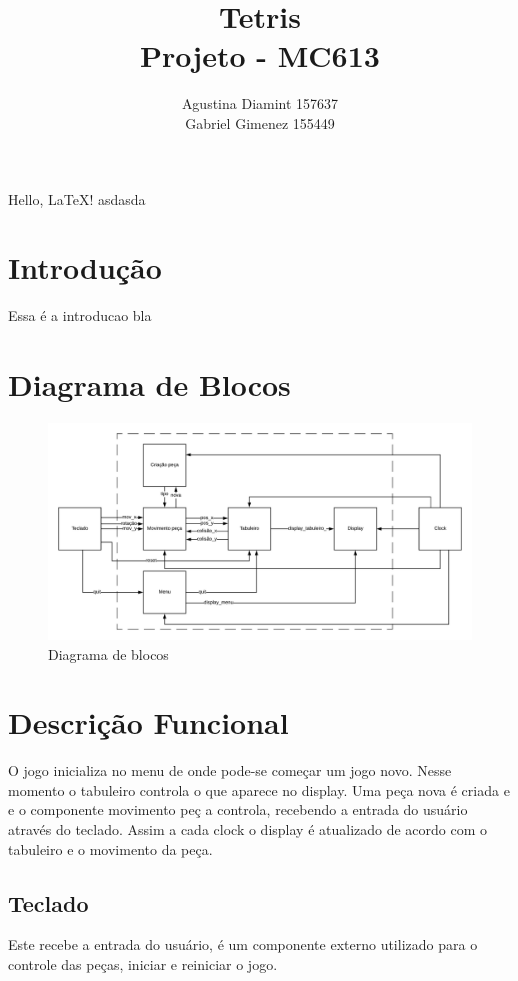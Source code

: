 \documentclass[a4paper,11pt]{article}
\begin{document}
\title{Tetris\\
	Projeto - MC613}
\author{Agustina Diamint 157637\\
 Gabriel Gimenez 155449}
\maketitle
Hello, \LaTeX! asdasda
\section{Introdu\c{c}\~ao}
Essa \'e a introducao bla
\section{Diagrama de Blocos}
\begin{figure}[!htb]
\centering
\includegraphics[width=\textwidth]{Diagrama_de_blocos}
\caption{Diagrama de blocos}
\end{figure}

\section{Descri\c{c}\~ao Funcional}
O jogo inicializa no menu de onde pode-se come\c{c}ar um jogo novo. Nesse momento o tabuleiro controla o que aparece no display. Uma pe\c{c}a nova \'e criada e e o componente  movimento pe\c{c} a controla, recebendo a entrada do usu\'ario atrav\'es do teclado. Assim a cada clock o display \'e atualizado de acordo com o tabuleiro e o movimento da pe\c{c}a.

\subsection{Teclado}
Este recebe a entrada do usu\'ario, \'e um componente externo utilizado para o controle das pe\c{c}as, iniciar e reiniciar o jogo. 
\end{document}

